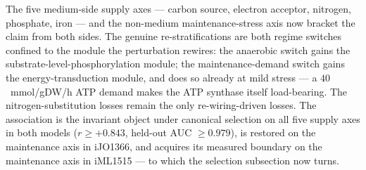 \begin{remark}
\label{rem:keio-multiaxis}
The five medium-side supply axes --- carbon source, electron
acceptor, nitrogen, phosphate, iron --- and the non-medium
maintenance-stress axis now bracket the claim from both sides. The
genuine re-stratifications are both regime switches confined to
the module the perturbation rewires: the anaerobic switch gains
the substrate-level-phosphorylation module; the maintenance-demand
switch gains the energy-transduction module, and does so already
at mild stress --- a $40$~mmol/gDW/h ATP demand makes the ATP
synthase itself load-bearing. The nitrogen-substitution losses
remain the only re-wiring-driven losses. The association is the
invariant object under canonical selection on all five supply
axes in both models ($r\ge+0.843$, held-out AUC $\ge0.979$),
is restored on the maintenance axis in iJO1366, and acquires its
measured boundary on the maintenance axis in iML1515 ---
to which the selection subsection now turns.
\end{remark}
